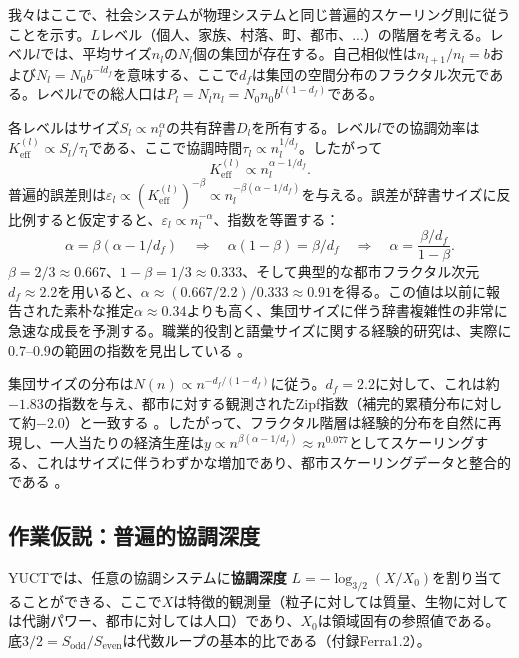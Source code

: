 \documentclass[11pt,a4paper]{article}
\theoremstyle{remark}
\newcommand{\Keff}{K_{\mathrm{eff}}}
\begin{document}
	我々はここで、社会システムが物理システムと同じ普遍的スケーリング則に従うことを示す。\(L\)レベル（個人、家族、村落、町、都市、...）の階層を考える。レベル\(l\)では、平均サイズ\(n_l\)の\(N_l\)個の集団が存在する。自己相似性は\(n_{l+1}/n_l = b\)および\(N_l = N_0 b^{-l d_f}\)を意味する、ここで\(d_f\)は集団の空間分布のフラクタル次元である。レベル\(l\)での総人口は\(P_l = N_l n_l = N_0 n_0 b^{l(1-d_f)}\)である。
	
	各レベルはサイズ\(S_l \propto n_l^{\alpha}\)の共有辞書\(D_l\)を所有する。レベル\(l\)での協調効率は\(\Keff^{(l)} \propto S_l / \tau_l\)である、ここで協調時間\(\tau_l \propto n_l^{1/d_f}\)。したがって
	\begin{equation}
		\Keff^{(l)} \propto n_l^{\alpha - 1/d_f}. \tag{1}
	\end{equation}
	普遍的誤差則は\(\varepsilon_l \propto (\Keff^{(l)})^{-\beta} \propto n_l^{-\beta(\alpha - 1/d_f)}\)を与える。誤差が辞書サイズに反比例すると仮定すると、\(\varepsilon_l \propto n_l^{-\alpha}\)、指数を等置する：
	\begin{equation}
		\alpha = \beta(\alpha - 1/d_f) \quad\Longrightarrow\quad \alpha(1-\beta) = \beta / d_f \quad\Longrightarrow\quad \alpha = \frac{\beta / d_f}{1-\beta}.
	\end{equation}
	\(\beta = 2/3 \approx 0.667\)、\(1-\beta = 1/3 \approx 0.333\)、そして典型的な都市フラクタル次元\(d_f \approx 2.2\)を用いると、\(\alpha \approx (0.667/2.2)/0.333 \approx 0.91\)を得る。この値は以前に報告された素朴な推定\(\alpha \approx 0.34\)よりも高く、集団サイズに伴う辞書複雑性の非常に急速な成長を予測する。職業的役割と語彙サイズに関する経験的研究は、実際に\(0.7\)–\(0.9\)の範囲の指数を見出している \cite{Bettencourt2007, Molinero2024}。
	
	集団サイズの分布は\(N(n) \propto n^{-d_f/(1-d_f)}\)に従う。\(d_f = 2.2\)に対して、これは約\(-1.83\)の指数を与え、都市に対する観測されたZipf指数（補完的累積分布に対して約\(-2.0\)）と一致する \cite{Fluschnik2016, Rybski2023}。したがって、フラクタル階層は経験的分布を自然に再現し、一人当たりの経済生産は\(y \propto n^{\beta(\alpha - 1/d_f)} \approx n^{0.077}\)としてスケーリングする、これはサイズに伴うわずかな増加であり、都市スケーリングデータと整合的である \cite{Bettencourt2007}。
	
	\subsection{作業仮説：普遍的協調深度}
	\label{sec:isomorphism}
	
	YUCTでは、任意の協調システムに\textbf{協調深度} \(L = -\log_{3/2}(X/X_0)\)を割り当てることができる、ここで\(X\)は特徴的観測量（粒子に対しては質量、生物に対しては代謝パワー、都市に対しては人口）であり、\(X_0\)は領域固有の参照値である。底\(3/2 = S_{\mathrm{odd}}/S_{\mathrm{even}}\)は代数ループの基本的比である（付録Ferra1.2）。
	
\end{document}
